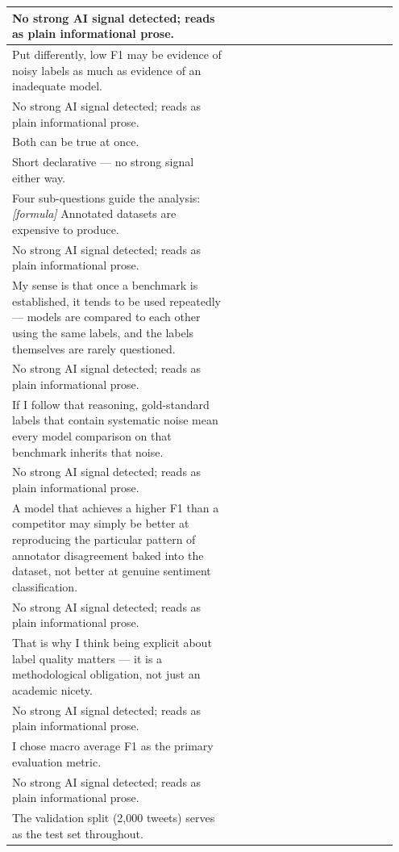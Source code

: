 \documentclass[11pt]{article}
\begin{document}
\begin{longtable}{|p{0.55\linewidth}|p{0.40\linewidth}|}
\hline
No strong AI signal detected; reads as plain informational prose. & \\
\hline
Put differently, low F1 may be evidence of noisy labels as much as evidence of an inadequate model. & \\[2pt]
\hline
No strong AI signal detected; reads as plain informational prose. & \\
\hline
Both can be true at once. & \\[2pt]
\hline
Short declarative --- no strong signal either way. & \\
\hline
Four sub-questions guide the analysis: \textit{[formula]} Annotated datasets are expensive to produce. & \\[2pt]
\hline
No strong AI signal detected; reads as plain informational prose. & \\
\hline
My sense is that once a benchmark is established, it tends to be used repeatedly --- models are compared to each other using the same labels, and the labels themselves are rarely questioned. & \\[2pt]
\hline
No strong AI signal detected; reads as plain informational prose. & \\
\hline
If I follow that reasoning, gold-standard labels that contain systematic noise mean every model comparison on that benchmark inherits that noise. & \\[2pt]
\hline
No strong AI signal detected; reads as plain informational prose. & \\
\hline
A model that achieves a higher F1 than a competitor may simply be better at reproducing the particular pattern of annotator disagreement baked into the dataset, not better at genuine sentiment classification. & \\[2pt]
\hline
No strong AI signal detected; reads as plain informational prose. & \\
\hline
That is why I think being explicit about label quality matters --- it is a methodological obligation, not just an academic nicety. & \\[2pt]
\hline
No strong AI signal detected; reads as plain informational prose. & \\
\hline
I chose macro average F1 as the primary evaluation metric. & \\[2pt]
\hline
No strong AI signal detected; reads as plain informational prose. & \\
\hline
The validation split (2,000 tweets) serves as the test set throughout. & \\[2pt]
\hline

\end{longtable}
\end{document}

